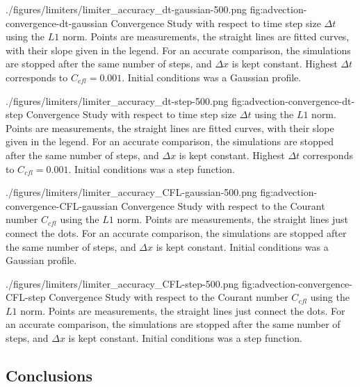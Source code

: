 \quickfigcap
	{./figures/limiters/limiter_accuracy_dt-gaussian-500.png}
	{fig:advection-convergence-dt-gaussian}
	{
		Convergence Study with respect to time step size $\Delta t$ using the $L1$ norm.
		Points are measurements, the straight lines are fitted curves, with their slope given in the legend.
		For an accurate comparison, the simulations are stopped after the same number of steps, and $\Delta x$ is kept constant.
		Highest $\Delta t$ corresponds to $C_{cfl} = 0.001$.
		Initial conditions was a Gaussian profile.
	}


\quickfigcap
	{./figures/limiters/limiter_accuracy_dt-step-500.png}
	{fig:advection-convergence-dt-step}
	{
		Convergence Study with respect to time step size $\Delta t$ using the $L1$ norm.
		Points are measurements, the straight lines are fitted curves, with their slope given in the legend.
		For an accurate comparison, the simulations are stopped after the same number of steps, and $\Delta x$ is kept constant.
		Highest $\Delta t$ corresponds to $C_{cfl} = 0.001$.
		Initial conditions was a step function.
	}
	



\quickfigcap
	{./figures/limiters/limiter_accuracy_CFL-gaussian-500.png}
	{fig:advection-convergence-CFL-gaussian}
	{
		Convergence Study with respect to the Courant number $C_{cfl}$ using the $L1$ norm.
		Points are measurements, the straight lines just connect the dots.
		For an accurate comparison, the simulations are stopped after the same number of steps, and $\Delta x$ is kept constant.
		Initial conditions was a Gaussian profile.
	}


\quickfigcap
	{./figures/limiters/limiter_accuracy_CFL-step-500.png}
	{fig:advection-convergence-CFL-step}
	{
		Convergence Study with respect to the Courant number $C_{cfl}$ using the $L1$ norm.
		Points are measurements, the straight lines just connect the dots.
		For an accurate comparison, the simulations are stopped after the same number of steps, and $\Delta x$ is kept constant.
		Initial conditions was a step function.
	}
	



















\subsection{Conclusions} \label{chap:advection-conclusions}

